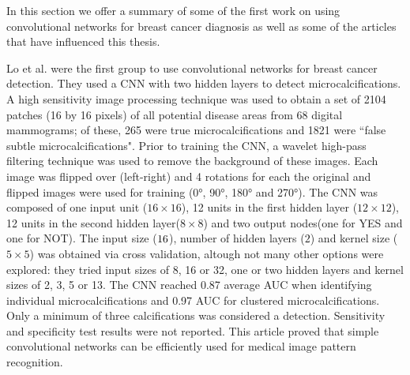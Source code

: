 In this section we offer a summary of some of the first work on using convolutional networks for breast cancer diagnosis as well as some of the articles that have influenced this thesis.

Lo et al.\cite{Lo1995} were the first group to use convolutional networks for breast cancer detection. They used a CNN with two hidden layers to detect microcalcifications. A high sensitivity image processing technique was used to obtain a set of 2104 patches (16 by 16 pixels) of all potential disease areas from 68 digital mammograms; of these, 265 were true microcalcifications and 1821 were ``false subtle microcalcifications". Prior to training the CNN, a wavelet high-pass filtering technique was used to remove the background of these images. Each image was flipped over (left-right) and 4 rotations for each the original and flipped images were used for training (0°, 90°, 180° and 270°). The CNN was composed of one input unit ($16\times16$), 12 units in the first hidden layer ($12\times12$), 12 units in the second hidden layer($8\times 8$) and two output nodes(one for YES and one for NOT). The input size ($16\time16$), number of hidden layers ($2$) and kernel size ($5\times5$) was obtained via cross validation, altough not many other options were explored: they tried input sizes of 8, 16 or 32, one or two hidden layers and kernel sizes of 2, 3, 5 or 13. The CNN reached 0.87 average AUC when identifying individual microcalcifications and 0.97 AUC for clustered microcalcifications. Only a minimum of three calcifications was considered a detection. Sensitivity and specificity test results were not reported. This article proved that simple convolutional networks can be efficiently used for medical image pattern recognition.


